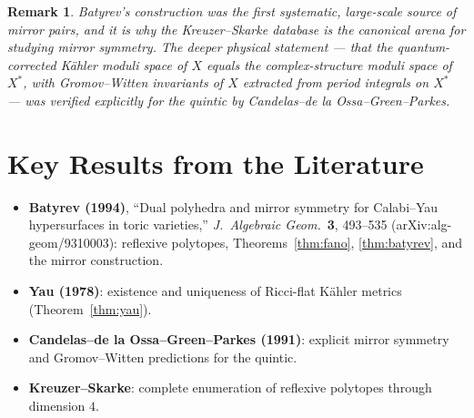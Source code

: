 \documentclass{amsart}
\newtheorem{remark}[theorem]{Remark}
\begin{document}
\begin{remark}
Batyrev's construction was the first systematic, large-scale source of
mirror pairs, and it is why the Kreuzer--Skarke database is the canonical
arena for studying mirror symmetry. The deeper physical statement --- that
the quantum-corrected K\"ahler moduli space of $X$ equals the
complex-structure moduli space of $X^*$, with Gromov--Witten invariants of
$X$ extracted from period integrals on $X^*$ --- was verified explicitly
for the quintic by Candelas--de la Ossa--Green--Parkes.
\end{remark}

\section{Key Results from the Literature}
\begin{itemize}
  \item \textbf{Batyrev (1994)}, ``Dual polyhedra and mirror symmetry for
        Calabi--Yau hypersurfaces in toric varieties,'' \emph{J.\ Algebraic
        Geom.}\ \textbf{3}, 493--535 (arXiv:alg-geom/9310003): reflexive
        polytopes, Theorems~\ref{thm:fano}, \ref{thm:batyrev}, and the
        mirror construction.
  \item \textbf{Yau (1978)}: existence and uniqueness of Ricci-flat K\"ahler
        metrics (Theorem~\ref{thm:yau}).
  \item \textbf{Candelas--de la Ossa--Green--Parkes (1991)}: explicit mirror
        symmetry and Gromov--Witten predictions for the quintic.
  \item \textbf{Kreuzer--Skarke}: complete enumeration of reflexive
        polytopes through dimension $4$.
\end{itemize}
\end{document}
